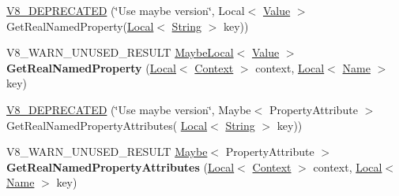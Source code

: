 \begin{DoxyCompactItemize}
\item 
\hyperlink{classv8_1_1_object_a870785c34482a0d284e56db93cd1eb5a}{V8\+\_\+\+D\+E\+P\+R\+E\+C\+A\+T\+ED} (\char`\"{}Use maybe version\char`\"{}, Local$<$ \hyperlink{classv8_1_1_value}{Value} $>$ Get\+Real\+Named\+Property(\hyperlink{classv8_1_1_local}{Local}$<$ \hyperlink{classv8_1_1_string}{String} $>$ key))
\item 
V8\+\_\+\+W\+A\+R\+N\+\_\+\+U\+N\+U\+S\+E\+D\+\_\+\+R\+E\+S\+U\+LT \hyperlink{classv8_1_1_maybe_local}{Maybe\+Local}$<$ \hyperlink{classv8_1_1_value}{Value} $>$ {\bfseries Get\+Real\+Named\+Property} (\hyperlink{classv8_1_1_local}{Local}$<$ \hyperlink{classv8_1_1_context}{Context} $>$ context, \hyperlink{classv8_1_1_local}{Local}$<$ \hyperlink{classv8_1_1_name}{Name} $>$ key)\hypertarget{classv8_1_1_object_ac291b66aa05feeac3fde47500ce0f60d}{}\label{classv8_1_1_object_ac291b66aa05feeac3fde47500ce0f60d}

\item 
\hyperlink{classv8_1_1_object_a9e3a8392408b53d887ea747151e1a823}{V8\+\_\+\+D\+E\+P\+R\+E\+C\+A\+T\+ED} (\char`\"{}Use maybe version\char`\"{}, Maybe$<$ Property\+Attribute $>$ Get\+Real\+Named\+Property\+Attributes(                                                                       \hyperlink{classv8_1_1_local}{Local}$<$ \hyperlink{classv8_1_1_string}{String} $>$ key))
\item 
V8\+\_\+\+W\+A\+R\+N\+\_\+\+U\+N\+U\+S\+E\+D\+\_\+\+R\+E\+S\+U\+LT \hyperlink{classv8_1_1_maybe}{Maybe}$<$ Property\+Attribute $>$ {\bfseries Get\+Real\+Named\+Property\+Attributes} (\hyperlink{classv8_1_1_local}{Local}$<$ \hyperlink{classv8_1_1_context}{Context} $>$ context, \hyperlink{classv8_1_1_local}{Local}$<$ \hyperlink{classv8_1_1_name}{Name} $>$ key)\hypertarget{classv8_1_1_object_aa928085fd056cf4864b3860dbd31472e}{}\label{classv8_1_1_object_aa928085fd056cf4864b3860dbd31472e}


\end{DoxyCompactItemize}
